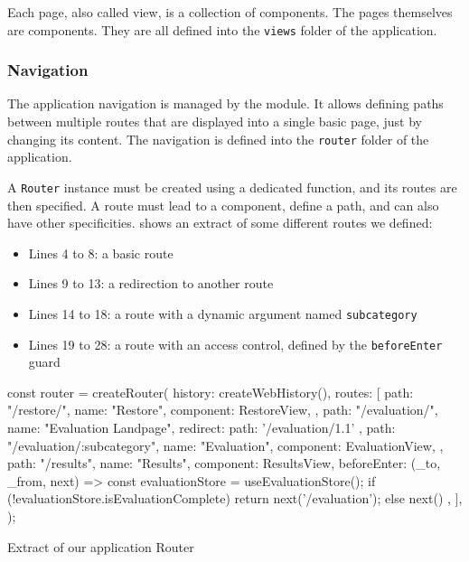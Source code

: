 Each page, also called view, is a collection of components. The pages themselves are components. They are all defined into the \texttt{views} folder of the application.

\subsubsection{Navigation}
\label{subsubsec:app_implementation_basics_navigation}

The application navigation is managed by the  module. It allows defining paths between multiple routes that are displayed into a single basic page, just by changing its content. The navigation is defined into the \texttt{router} folder of the application.

A \texttt{Router} instance must be created using a dedicated function, and its routes are then specified. A route must lead to a component, define a path, and can also have other specificities.  shows an extract of some different routes we defined:
\begin{itemize}
	\item Lines 4 to 8: a basic route
	\item Lines 9 to 13: a redirection to another route
	\item Lines 14 to 18: a route with a dynamic argument named \texttt{subcategory}
	\item Lines 19 to 28: a route with an access control, defined by the \texttt{beforeEnter} guard
\end{itemize}

\begin{listing}[!ht] 
	\begin{javascriptcode}
const router = createRouter({
	history: createWebHistory(),
	routes: [
		{
			path: "/restore/",
			name: "Restore",
			component: RestoreView,
		},
		{
			path: "/evaluation/",
			name: "Evaluation Landpage",
			redirect: { path: '/evaluation/1.1' }
		},
		{
			path: "/evaluation/:subcategory",
			name: "Evaluation",
			component: EvaluationView,
		},
		{
			path: "/results",
			name: "Results",
			component: ResultsView,
			beforeEnter: (_to, _from, next) => {
				const evaluationStore = useEvaluationStore();
				if (!evaluationStore.isEvaluationComplete) return next('/evaluation');
				else next()
			}
		},
	],
});
	\end{javascriptcode}
	\caption{Extract of our application Router}
	\label{lst:app_router}
\end{listing}


